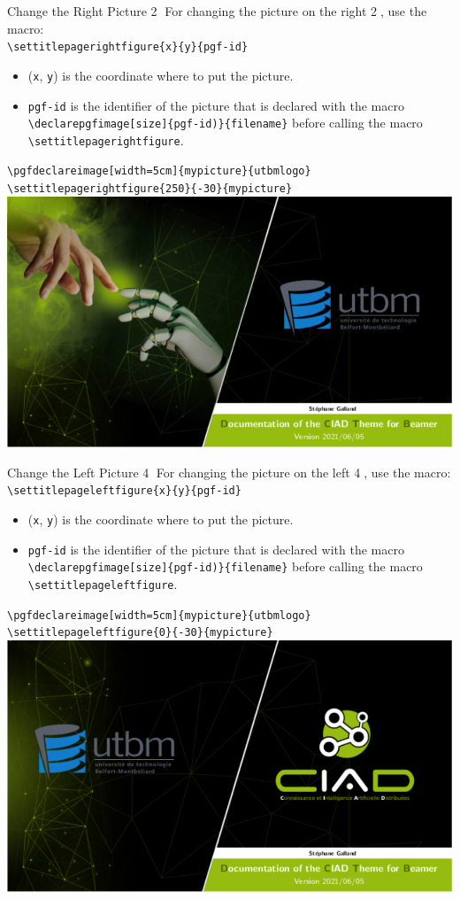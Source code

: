 \documentclass[english,sectioncirclenumberstyle]{ciadbeamer}
\begin{document}
\begin{frame}[t]{Change the Right Picture \textcircled{2}}
	For changing the picture on the right \textcircled{2}, use the macro: \\[.25cm]
	\texttt{{\textbackslash}settitlepagerightfigure\{x\}\{y\}\{pgf-id\}} \\[.25cm]
	\begin{itemize}
		\item (\texttt{x}, \texttt{y}) is the coordinate where to put the picture.
		\item \texttt{pgf-id} is the identifier of the picture that is declared with the macro \texttt{{\textbackslash}declarepgfimage[size]\{pgf-id)\}\{filename\}} before calling the macro \texttt{{\textbackslash}settitlepagerightfigure}.
	\end{itemize}
	\begin{example}
		\texttt{{\textbackslash}pgfdeclareimage[width=5cm]\{mypicture\}\{utbmlogo\}} \\
		\texttt{{\textbackslash}settitlepagerightfigure\{250\}\{-30\}\{mypicture\}} \\
		\centering\includegraphics[width=.25\linewidth]{frontpage2}
	\end{example}
\end{frame}

\begin{frame}[t]{Change the Left Picture \textcircled{4}}
	For changing the picture on the left \textcircled{4}, use the macro: \\[.25cm]
	\texttt{{\textbackslash}settitlepageleftfigure\{x\}\{y\}\{pgf-id\}} \\[.25cm]
	\begin{itemize}
		\item (\texttt{x}, \texttt{y}) is the coordinate where to put the picture.
		\item \texttt{pgf-id} is the identifier of the picture that is declared with the macro \texttt{{\textbackslash}declarepgfimage[size]\{pgf-id)\}\{filename\}} before calling the macro \texttt{{\textbackslash}settitlepageleftfigure}.
	\end{itemize}
	\begin{example}
		\texttt{{\textbackslash}pgfdeclareimage[width=5cm]\{mypicture\}\{utbmlogo\}} \\
		\texttt{{\textbackslash}settitlepageleftfigure\{0\}\{-30\}\{mypicture\}} \\
		\centering\includegraphics[width=.25\linewidth]{frontpage4}
	\end{example}
\end{frame}
\end{document}
